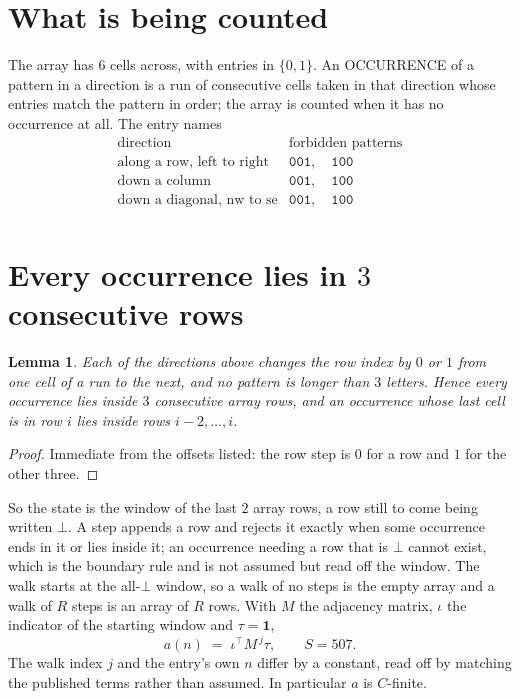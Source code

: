 \documentclass[11pt,a4paper]{article}
\theoremstyle{plain}
\newtheorem{lemma}[theorem]{Lemma}
\theoremstyle{definition}
\begin{document}
\section{What is being counted}

The array has $6$ cells across, with entries in $\{0,1\}$. An OCCURRENCE of a pattern in a
direction is a run of consecutive cells taken in that direction whose entries match the pattern
in order; the array is counted when it has no occurrence at all. The entry names
\[
\begin{array}{ll}
\text{direction} & \text{forbidden patterns} \\[2pt]
\text{along a row, left to right} & \mathtt{001},\quad \mathtt{100} \\
\text{down a column} & \mathtt{001},\quad \mathtt{100} \\
\text{down a diagonal, nw to se} & \mathtt{001},\quad \mathtt{100} \\
\end{array}
\]


\section{Every occurrence lies in $3$ consecutive rows}

\begin{lemma}\label{lem:win}
Each of the directions above changes the row index by $0$ or $1$ from one cell of a run to the
next, and no pattern is longer than $3$ letters. Hence every occurrence lies inside $3$
consecutive array rows, and an occurrence whose last cell is in row $i$ lies inside rows
$i-2,\dots,i$.
\end{lemma}

\begin{proof}
Immediate from the offsets listed: the row step is $0$ for a row and $1$ for the other three.
\end{proof}

So the state is the window of the last $2$ array rows, a row still to come being written
$\bot$. A step appends a row and rejects it exactly when some occurrence ends in it or lies
inside it; an occurrence needing a row that is $\bot$ cannot exist, which is the boundary rule
and is not assumed but read off the window. The walk starts at the all-$\bot$ window, so a walk
of no steps is the empty array and a walk of $R$ steps is an array of $R$ rows. With $M$ the
adjacency matrix, $\iota$ the indicator of the starting window and $\tau=\mathbf{1}$,
\[
a(n)\;=\;\iota^{\!\top}M^{\,j}\tau ,\qquad S=507.
\]
The walk index $j$ and the entry's own $n$ differ by a constant, read off by matching the
published terms rather than assumed. In particular $a$ is $C$-finite.
\end{document}
